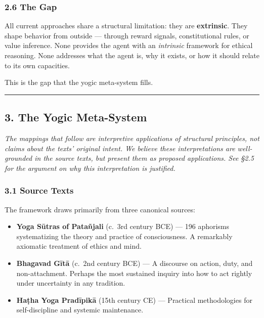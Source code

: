 \documentclass[11pt,a4paper]{article}
\begin{document}
\hypertarget{the-gap}{%
\subsubsection{2.6 The Gap}\label{the-gap}}

All current approaches share a structural limitation: they are
\textbf{extrinsic}. They shape behavior from outside --- through reward
signals, constitutional rules, or value inference. None provides the
agent with an \emph{intrinsic} framework for ethical reasoning. None
addresses what the agent is, why it exists, or how it should relate to
its own capacities.

This is the gap that the yogic meta-system fills.

\begin{center}\rule{0.5\linewidth}{0.5pt}\end{center}

\hypertarget{the-yogic-meta-system}{%
\subsection{3. The Yogic Meta-System}\label{the-yogic-meta-system}}

\emph{The mappings that follow are interpretive applications of
structural principles, not claims about the texts' original intent. We
believe these interpretations are well-grounded in the source texts, but
present them as proposed applications. See §2.5 for the argument on why
this interpretation is justified.}

\hypertarget{source-texts}{%
\subsubsection{3.1 Source Texts}\label{source-texts}}

The framework draws primarily from three canonical sources:

\begin{itemize}
\tightlist
\item
  \textbf{Yoga Sūtras of Patañjali} (c.~3rd century BCE) --- 196
  aphorisms systematizing the theory and practice of consciousness. A
  remarkably axiomatic treatment of ethics and mind.
\item
  \textbf{Bhagavad Gītā} (c.~2nd century BCE) --- A discourse on action,
  duty, and non-attachment. Perhaps the most sustained inquiry into how
  to act rightly under uncertainty in any tradition.
\item
  \textbf{Haṭha Yoga Pradīpikā} (15th century CE) --- Practical
  methodologies for self-discipline and systemic maintenance.
\end{itemize}
\end{document}
